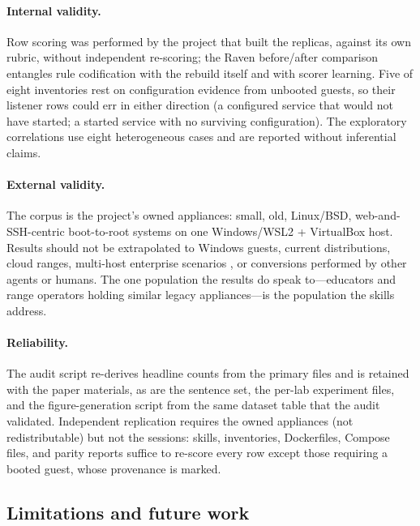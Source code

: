 \documentclass[3p,twocolumn,authoryear]{elsarticle}
\begin{document}
\paragraph{Internal validity.}
Row scoring was performed by the project that built the replicas,
against its own rubric, without independent re-scoring; the Raven
before/after comparison entangles rule codification with the rebuild
itself and with scorer learning. Five of eight inventories rest on
configuration evidence from unbooted guests, so their listener rows
could err in either direction (a configured service that would not
have started; a started service with no surviving configuration).
The exploratory correlations use eight heterogeneous cases and are
reported without inferential claims.

\paragraph{External validity.}
The corpus is the project's owned appliances: small, old, Linux/BSD,
web-and-SSH-centric boot-to-root systems on one Windows/WSL2 +
VirtualBox host. Results should not be extrapolated to Windows guests,
current distributions, cloud ranges, multi-host enterprise scenarios
\citep{chouliaras2023}, or conversions performed by other agents or
humans. The one population the results do speak to---educators and
range operators holding similar legacy appliances---is the population
the skills address.

\paragraph{Reliability.}
The audit script re-derives headline counts from the primary files and
is retained with the paper materials, as are the sentence set, the
per-lab experiment files, and the figure-generation script from the
same dataset table that the audit validated. Independent replication
requires the owned appliances (not redistributable) but not the
sessions: skills, inventories, Dockerfiles, Compose files, and parity
reports suffice to re-score every row except those requiring a booted
guest, whose provenance is marked.

\subsection{Limitations and future work}
\end{document}
